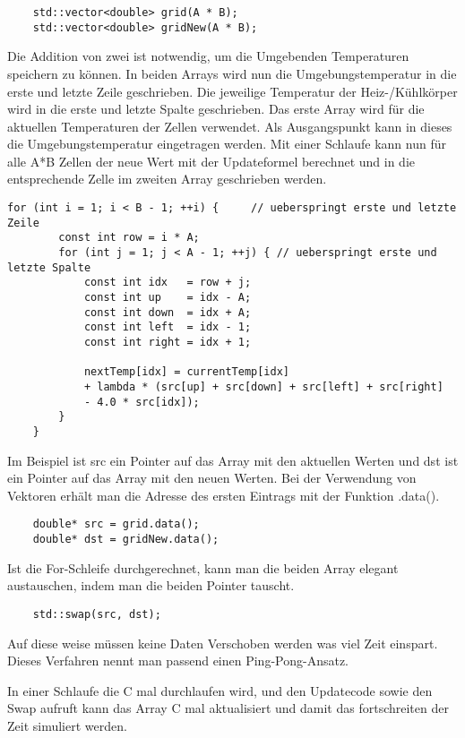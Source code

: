 \begin{lstlisting}
	std::vector<double> grid(A * B);
	std::vector<double> gridNew(A * B);
\end{lstlisting}
Die Addition von zwei ist notwendig, um die Umgebenden Temperaturen speichern zu können.
In beiden Arrays wird nun die Umgebungstemperatur in die erste und letzte Zeile geschrieben.
Die jeweilige Temperatur der Heiz-/Kühlkörper wird in die erste und letzte Spalte geschrieben.
Das erste Array wird für die aktuellen Temperaturen der Zellen verwendet.
Als Ausgangspunkt kann in dieses die Umgebungstemperatur eingetragen werden.
Mit einer Schlaufe kann nun für alle A*B Zellen der neue Wert mit der Updateformel berechnet und in die entsprechende Zelle im zweiten Array geschrieben werden.
\begin{lstlisting}[caption={Update-Schritt (seriell)},label={parallelisierung:code:updateSeriel}]
	for (int i = 1; i < B - 1; ++i) {     // ueberspringt erste und letzte Zeile
		const int row = i * A;
		for (int j = 1; j < A - 1; ++j) { // ueberspringt erste und letzte Spalte
			const int idx   = row + j;
			const int up    = idx - A;
			const int down  = idx + A;
			const int left  = idx - 1;
			const int right = idx + 1;
			
			nextTemp[idx] = currentTemp[idx]
			+ lambda * (src[up] + src[down] + src[left] + src[right]
			- 4.0 * src[idx]);
		}
	}
\end{lstlisting}
Im Beispiel ist src ein Pointer auf das Array mit den aktuellen Werten und dst ist ein Pointer auf das Array mit den neuen Werten.
Bei der Verwendung von Vektoren erhält man die Adresse des ersten Eintrags mit der Funktion .data().
\begin{lstlisting}
	double* src = grid.data();
	double* dst = gridNew.data();
\end{lstlisting}

Ist die For-Schleife durchgerechnet, kann man die beiden Array elegant austauschen, indem man die beiden Pointer tauscht.
\begin{lstlisting}
	std::swap(src, dst);
\end{lstlisting}
Auf diese weise müssen keine Daten Verschoben werden was viel Zeit einspart.
Dieses Verfahren nennt man passend einen Ping-Pong-Ansatz.

In einer Schlaufe die C mal durchlaufen wird, und den Updatecode sowie den Swap aufruft kann das Array C mal aktualisiert und damit das fortschreiten der Zeit simuliert werden.


